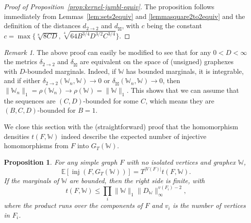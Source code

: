\documentclass{amsart}
\numberwithin{equation}{section}
\numberwithin{figure}{section}
\newtheorem{proposition}[theorem]{Proposition}
\theoremstyle{definition}
\theoremstyle{remark}
\newtheorem{remark}[theorem]{Remark}
\newcommand{\jbl}{{\boxtimes}}
\DeclareMathOperator{\inj}{inj}
\newcommand{\EE}{\mathbb{E}}
\newcommand{\cW}{\mathbb{W}}
\newcommand{\deltt}{\delta_{2\to 2}}
\def\d22{d_{2\to 2}}
\def\djbl{d_{\jbl}}
\def\deljbl{\delta_{\jbl}}
\begin{document}
\begin{proof}[Proof of Proposition~\ref{prop:kernel-jumbl-equiv}]
The proposition follows immediately from Lemmas~\ref{lem:sets2equiv} and
\ref{lemmasquare2to2equiv} and the definition of the distances $\d22$ and
$\djbl$, with $c$ being the constant
$c=\max\{\sqrt[8]{8CD},\sqrt[4]{64B^{3/4}D^{3/2}C^{3/4}}\}$.
\end{proof}

\begin{remark}\label{rem:kernel-jumbl-equiv}
The above proof can easily be modified to see that for any $0<D<\infty$ the
metrics $\deltt$ and $\deljbl$ are equivalent on the space of (unsigned)
graphexes with $D$-bounded marginals. Indeed, if $\cW$ has bounded marginals,
it is integrable, and if either $\deltt(\cW_n,\cW)\to 0$ or
$\deljbl(\cW_n,\cW)\to 0$, then
$\|\cW_n\|_1=\rho(\cW_n)\to\rho(\cW)=\|\cW\|_1$. This shows that we can
assume that the sequences are $(C,D)$-bounded for some $C$, which means they
are $(B,C,D)$-bounded for $B=1$.
\end{remark}

We close this section with the (straightforward) proof that the homomorphism
densities $t(F,\cW)$ indeed describe the expected number of injective
homomorphisms from $F$ into $G_T(\cW)$.

\begin{proposition}\label{prop:t(F,W)}
For any simple graph $F$ with no isolated vertices and graphex $\cW$,
\[
\EE\left[\inj(F,G_T(\cW))\right]=T^{|V(F)|} t(F,\cW).
\]
If the marginals of $\cW$ are bounded, then the right side is finite, with
\[
t(F,\cW)\leq \prod_i\|\cW\|_1\|D_{\cW}\|_\infty^{v(F_i)-2},
\]
where the product runs over the components of $F$ and $v_i$ is the number
of vertices in $F_i$.
\end{proposition}
\end{document}
